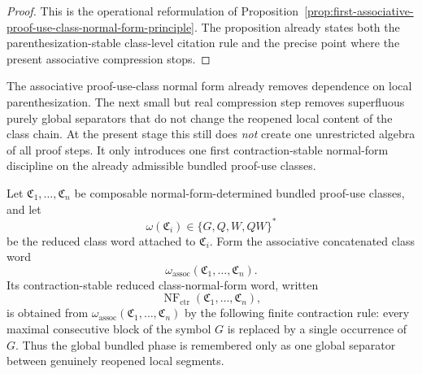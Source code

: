 \begin{proof}
This is the operational reformulation of Proposition~\ref{prop:first-associative-proof-use-class-normal-form-principle}. The proposition already states both the parenthesization-stable class-level citation rule and the precise point where the present associative compression stops.
\end{proof}



\begin{remark}
\label{rem:status-of-the-first-contraction-stable-class-normal-form-step}
The associative proof-use-class normal form already removes dependence on local parenthesization. The next small but real compression step removes superfluous purely global separators that do not change the reopened local content of the class chain. At the present stage this still does \emph{not} create one unrestricted algebra of all proof steps. It only introduces one first contraction-stable normal-form discipline on the already admissible bundled proof-use classes.
\end{remark}

\begin{definition}
\label{def:contraction-stable-reduced-class-normal-form-word}
Let $\mathfrak C_1,\dots,\mathfrak C_n$ be composable normal-form-determined bundled proof-use classes, and let
\[
\omega(\mathfrak C_i)\in \{G,Q,W,QW\}^{\ast}
\]
be the reduced class word attached to $\mathfrak C_i$. Form the associative concatenated class word
\[
\omega_{\mathrm{assoc}}(\mathfrak C_1,\dots,\mathfrak C_n).
\]
Its contraction-stable reduced class-normal-form word, written
\[
\operatorname{NF}_{\mathrm{ctr}}(\mathfrak C_1,\dots,\mathfrak C_n),
\]
is obtained from $\omega_{\mathrm{assoc}}(\mathfrak C_1,\dots,\mathfrak C_n)$ by the following finite contraction rule: every maximal consecutive block of the symbol $G$ is replaced by a single occurrence of $G$. Thus the global bundled phase is remembered only as one global separator between genuinely reopened local segments.
\end{definition}

